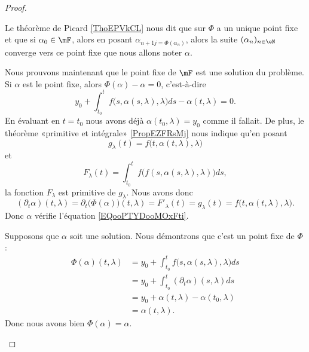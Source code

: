 \begin{proof}
\begin{subproof}
		\spitem[Picard]
		Le théorème de Picard \ref{ThoEPVkCL} nous dit que sur \( \Phi\) a un unique point fixe et que si \( \alpha_0\in \mF\), alors en posant \(\alpha_{n+1j=\Phi(\alpha_n)}\), alors la suite \( (\alpha_n)_{n\in \eN}\) converge vers ce point fixe que nous allons noter \( \alpha\).

		Nous prouvons maintenant que le point fixe de \( \mF\) est une solution du problème. Si \( \alpha\) est le point fixe, alors \( \Phi(\alpha)-\alpha=0\), c'est-à-dire
		\begin{equation}
			y_0+\int_{t_0}^tf\big( s,\alpha(s,\lambda),\lambda \big)ds-\alpha(t,\lambda)=0.
		\end{equation}
		En évaluant en \( t=t_0\) nous avons déjà \( \alpha(t_0,\lambda)=y_0\) comme il fallait. De plus, le théorème «primitive et intégrale» \ref{PropEZFRsMj} nous indique qu'en posant
		\begin{equation}
			g_{\lambda}(t)=f\big( t,\alpha(t,\lambda),\lambda \big)
		\end{equation}
		et
		\begin{equation}
			F_{\lambda}(t)=\int_{t_0}^tf\big( f(s,\alpha(s,\lambda),\lambda) \big)ds,
		\end{equation}
		la fonction \( F_{\lambda}\) est primitive de \( g_{\lambda}\). Nous avons donc
		\begin{equation}
			(\partial_t\alpha)(t,\lambda)=\partial_t\big( \Phi(\alpha) \big)(t,\lambda)=F'_{\lambda}(t)=g_{\lambda}(t)=f\big( t,\alpha(t,\lambda),\lambda \big).
		\end{equation}
		Donc \( \alpha\) vérifie l'équation \ref{EQooPTYDooMOxFti}.

		Supposons que \( \alpha\) soit une solution. Nous démontrons que c'est un point fixe de \( \Phi\) :
		\begin{subequations}
			\begin{align}
				\Phi(\alpha)(t,\lambda) & =y_0+\int_{t_0}^tf\big(  s,\alpha(s,\lambda),\lambda\big)ds \\
				                        & =y_0+\int_{t_0}^t(\partial_t\alpha)(s,\lambda)ds            \\
				                        & =y_0+\alpha(t,\lambda)-\alpha(t_0,\lambda)                  \\
				                        & =\alpha(t,\lambda).
			\end{align}
		\end{subequations}
		Donc nous avons bien \( \Phi(\alpha)=\alpha\).


\end{subproof}
\end{proof}
